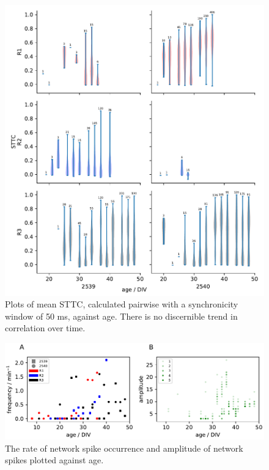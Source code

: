 \documentclass{bmcart}
\begin{document}
\begin{backmatter}
\begin{figure}[h!]
    \includegraphics{../plots/correlation_plots.pdf}
	\caption{Plots of mean STTC, calculated pairwise with a synchronicity window of 50 ms, against age. There is no discernible trend in correlation over time.}
	\label{fig:correlation}
\end{figure}

\begin{figure}[h!]
    \includegraphics{../plots/network_spikes_scatter.pdf}
	\caption{The rate of network spike occurrence and amplitude of network spikes plotted against age.}
	\label{fig:networkfreq}
\end{figure}

\end{backmatter}
\end{document}
